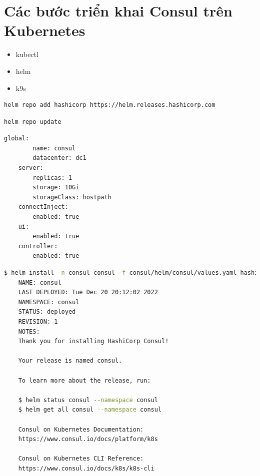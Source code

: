 \documentclass[12pt,a4paper]{report}
\begin{document}
	\section{Các bước triển khai Consul trên Kubernetes}
	\hspace{1.0cm}{Để triển khai Consul trên Kubernetes, chúng ta sẽ cần phải có những công cụ sau đây:\\}
	\begin{itemize}
		\item kubectl
		\item helm
		\item k9s
	\end{itemize}
	\hspace{0.3cm}{Dưới đây là các câu lệnh để triển khai Consul, chúng ta sẽ sử dụng Chart của Hashicorp cung cấp. Đầu tiên, chúng ta cần phải thêm nguồn chart vào trong dữ liệu Helm của chúng ta với câu lệnh sau:}
	\begin{lstlisting}[language=Bash]
	helm repo add hashicorp https://helm.releases.hashicorp.com
	\end{lstlisting}
	\hspace{1.0cm}{Tiếp theo, chúng ta sẽ cập nhật chart với câu lệnh: }
	\begin{lstlisting}[language=Bash]
	helm repo update
	\end{lstlisting}
	\hspace{1.0cm}{Sau đó, chúng ta tạo một tệp tin có tên là values.yaml, nội dung trong tệp tin như sau: }
	\begin{lstlisting}[language=Bash]
	global:
		name: consul
		datacenter: dc1
	server:
		replicas: 1
		storage: 10Gi
		storageClass: hostpath
	connectInject:
		enabled: true
	ui:
		enabled: true
	controller:
		enabled: true
	\end{lstlisting}
	\hspace{1.0cm}{Sau đó, chúng ta bắt đầu chạy câu lệnh sau:}
	\begin{lstlisting}[language=Bash]
	$ helm install -n consul consul -f consul/helm/consul/values.yaml hashicorp/consul
	NAME: consul
	LAST DEPLOYED: Tue Dec 20 20:12:02 2022   
	NAMESPACE: consul
	STATUS: deployed
	REVISION: 1
	NOTES:
	Thank you for installing HashiCorp Consul!
	
	Your release is named consul.
	
	To learn more about the release, run:     
	
	$ helm status consul --namespace consul 
	$ helm get all consul --namespace consul
	
	Consul on Kubernetes Documentation:       
	https://www.consul.io/docs/platform/k8s   
	
	Consul on Kubernetes CLI Reference:       
	https://www.consul.io/docs/k8s/k8s-cli
	\end{lstlisting}
	\hspace{1.0cm}{Vậy là chúng ta đã triển khai thành công Consul lên trên Kubernetes. Tiếp theo, chúng ta sẽ đến với các phần thực nghiệm.}
\end{document}
